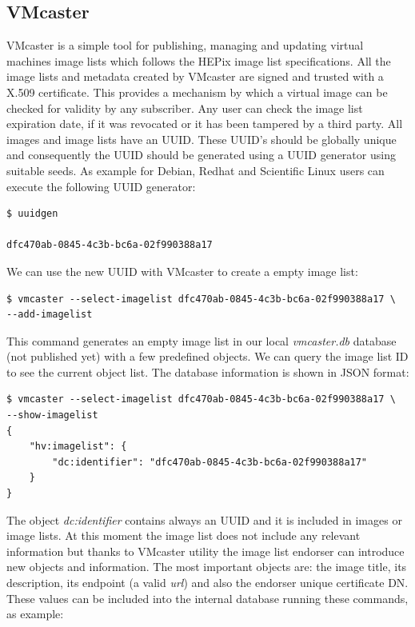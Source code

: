 \documentclass{llncs_Ibergrid2013}
\begin{document}
\subsection{VMcaster}
VMcaster is a simple tool for publishing, managing and updating virtual machines image lists which follows the HEPix image list specifications.
All the image lists and metadata created by VMcaster are signed and trusted with a X.509 certificate.
This provides a mechanism by which a virtual image can be checked for validity by any subscriber. Any user can check the image list expiration date, if it was revocated or it has been tampered by a third party.
All images and image lists have an UUID. These UUID's should be globally unique and consequently the UUID should be generated using a UUID generator using suitable seeds. As example for Debian, Redhat and Scientific Linux users can execute the following UUID generator:
\begin{verbatim}
$ uuidgen

dfc470ab-0845-4c3b-bc6a-02f990388a17
\end{verbatim}
We can use the new UUID with VMcaster to create a empty image list:
\begin{verbatim}
$ vmcaster --select-imagelist dfc470ab-0845-4c3b-bc6a-02f990388a17 \
--add-imagelist
\end{verbatim}
This command generates an empty image list in our local \textit{vmcaster.db} database (not published yet) with a few predefined objects. We can query the image list ID to see the current object list.
The database information is shown in JSON format:
\begin{verbatim}
$ vmcaster --select-imagelist dfc470ab-0845-4c3b-bc6a-02f990388a17 \
--show-imagelist
{
    "hv:imagelist": {
        "dc:identifier": "dfc470ab-0845-4c3b-bc6a-02f990388a17"
    }
}
\end{verbatim}
The object \textit{dc:identifier} contains always an UUID and it is included in images or image lists. 
At this moment the image list does not include any relevant information but thanks to VMcaster utility the image list endorser can introduce new objects and information.
The most important objects are: the image title, its description, its endpoint (a valid \textit{url}) and also the endorser unique certificate DN. 
These values can be included into the internal database running these commands, as example:
\end{document}
